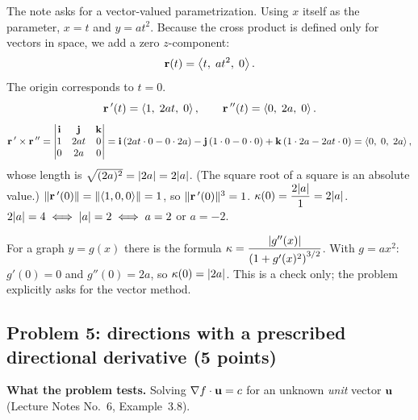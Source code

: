  The note asks for a
vector-valued parametrization. Using $x$ itself as the parameter, $x=t$ and
$y=at^2$. Because the cross product is defined only for vectors in space, we add
a zero $z$-component:
\[
  \mathbf{r}(t)=\left\langle t,\;at^2,\;0 \right\rangle.
\]
The origin corresponds to $t=0$.
\[
  \mathbf{r}\,'(t)=\left\langle 1,\;2at,\;0 \right\rangle,\qquad\mathbf{r}\,''(t)=\left\langle 0,\;2a,\;0 \right\rangle.
\]
\[
  \mathbf{r}\,'\times\mathbf{r}\,''=\begin{vmatrix}\mathbf{i}&\mathbf{j}&\mathbf{k}\\1&2at&0\\0&2a&0\end{vmatrix}
  =\mathbf{i}\,(2at\cdot0-0\cdot2a)-\mathbf{j}\,(1\cdot0-0\cdot0)+\mathbf{k}\,(1\cdot2a-2at\cdot0)=\left\langle 0,\;0,\;2a \right\rangle,
\]
whose length is $\sqrt{(2a)^2}=\lvert2a\rvert=2\lvert a\rvert$. (The square root of a square is an
absolute value.)
 $\lVert\mathbf{r}\,'(0)\rVert=\lVert\left\langle 1,0,0 \right\rangle\rVert=1$, so $\lVert\mathbf{r}\,'(0)\rVert^3=1$.
 $\kappa(0)=\dfrac{2\lvert a\rvert}{1}=2\lvert a\rvert$.
 $2\lvert a\rvert=4\iff\lvert a\rvert=2\iff a=2$ or $a=-2$.



\begin{altmethod}
For a graph $y=g(x)$ there is the formula $\kappa=\dfrac{\lvert g''(x)\rvert}{\left(1+g'(x)^2\right)^{3/2}}$.
With $g=ax^2$: $g'(0)=0$ and $g''(0)=2a$, so $\kappa(0)=\lvert2a\rvert$. This is a check only;
the problem explicitly asks for the vector method.
\end{altmethod}


\subsection{Problem 5: directions with a prescribed directional derivative (5 points)}

\textbf{What the problem tests.} Solving $\nabla f\cdot\mathbf{u}=c$ for an unknown
\emph{unit} vector $\mathbf{u}$ (Lecture Notes No.~6, Example~3.8).

